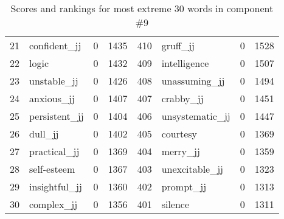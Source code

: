 \begin{table}[tbp]
\begin{tabular}{| rlr@{.}l | rlr@{.}l |}
    21 & confident\_jj & 0 & 1435    &    410 & gruff\_jj & 0 & 1528 \\
    22 & logic & 0 & 1432    &    409 & intelligence & 0 & 1507 \\
    23 & unstable\_jj & 0 & 1426    &    408 & unassuming\_jj & 0 & 1494 \\
    24 & anxious\_jj & 0 & 1407    &    407 & crabby\_jj & 0 & 1451 \\
    25 & persistent\_jj & 0 & 1404    &    406 & unsystematic\_jj & 0 & 1447 \\
    26 & dull\_jj & 0 & 1402    &    405 & courtesy & 0 & 1369 \\
    27 & practical\_jj & 0 & 1369    &    404 & merry\_jj & 0 & 1359 \\
    28 & self-esteem & 0 & 1367    &    403 & unexcitable\_jj & 0 & 1323 \\
    29 & insightful\_jj & 0 & 1360    &    402 & prompt\_jj & 0 & 1313 \\
    30 & complex\_jj & 0 & 1356    &    401 & silence & 0 & 1311 \\
    \hline
    \end{tabular}
    \caption{Scores and rankings for most extreme 30 words in component \#9} 
\end{table}
\clearpage
